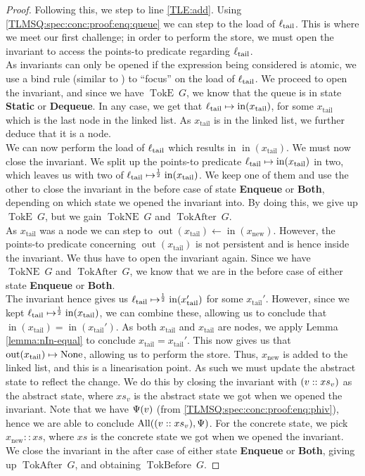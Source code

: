 \documentclass[a4paper, 10pt]{report}
\theoremstyle{definition}
\newcommand{\xsc}{xs}
\newcommand{\AllP}{\operatorname{All}}
\newcommand{\locN}[1]{\loc_{\mathrm{#1}}}
\newcommand{\loctail}{\locN{tail}}
\newcommand{\nIn}[1]{\operatorname{in}(#1)}
\newcommand{\nOut}[1]{\operatorname{out}(#1)}
\newcommand{\node}{x}
\newcommand{\nodeN}[1]{\node_{\mathrm{#1}}}
\newcommand{\nodetail}{\nodeN{tail}}
\newcommand{\nodenew}{\nodeN{new}}
\newcommand{\absvalue}{\val}
\newcommand{\absvalueList}{xs_v}
\newcommand{\StaticState}{\textbf{Static}\xspace}
\newcommand{\EnqueueState}{\textbf{Enqueue}\xspace}
\newcommand{\DequeueState}{\textbf{Dequeue}\xspace}
\newcommand{\BothState}{\textbf{Both}\xspace}
\newcommand{\Qg}{G}
\newcommand{\TokE}[1]{\operatorname{TokE} ~ #1}
\newcommand{\TokEQg}{\TokE{\Qg}}
\newcommand{\TokNE}[1]{\operatorname{TokNE} ~ #1}
\newcommand{\TokNEQg}{\TokNE{\Qg}}
\newcommand{\TokBefore}[1]{\operatorname{TokBefore} ~ #1}
\newcommand{\TokBeforeQg}{\TokBefore{\Qg}}
\newcommand{\TokAfter}[1]{\operatorname{TokAfter} ~ #1}
\newcommand{\TokAfterQg}{\TokAfter{\Qg}}
\begin{document}
\begin{proof}
Following this, we step to line \ref{TLE:add}. Using \ref{TLMSQ:spec:conc:proof:enq:queue} we can step to the load of $\loctail$. This is where we meet our first challenge; in order to perform the store, we must open the invariant to access the points-to predicate regarding $\loctail$.\\
As invariants can only be opened if the expression being considered is atomic, we use a bind rule (similar to ) to ``focus'' on the load of $\loctail$. We proceed to open the invariant, and since we have $\TokEQg$, we know that the queue is in state \StaticState or \DequeueState. In any case, we get that $\loctail \mapsto \nIn{\nodetail}$, for some $\nodetail$ which is the last node in the linked list. As $\nodetail$ is in the linked list, we further deduce that it is a node.\\
We can now perform the load of $\loctail$ which results in $\nIn{\nodetail}$. We must now close the invariant. We split up the points-to predicate $\loctail \mapsto \nIn{\nodetail}$ in two, which leaves us with two of $\loctail \mapsto^{\frac{1}{2}} \nIn{\nodetail}$. We keep one of them and use the other to close the invariant in the before case of state \EnqueueState or \BothState, depending on which state we opened the invariant into. By doing this, we give up $\TokEQg$, but we gain $\TokNEQg$ and $\TokAfterQg$.\\
As $\nodetail$ was a node we can step to $\nOut{\nodetail} \gets \nIn{\nodenew}$. However, the points-to predicate concerning $\nOut{\nodetail}$ is not persistent and is hence inside the invariant. We thus have to open the invariant again. Since we have $\TokNEQg$ and $\TokAfterQg$, we know that we are in the before case of either state \EnqueueState or \BothState.\\
The invariant hence gives us $\loctail \mapsto^{\frac{1}{2}} \nIn{\nodetail'}$ for some $\nodetail'$. However, since we kept $\loctail \mapsto^{\frac{1}{2}} \nIn{\nodetail}$, we can combine these, allowing us to conclude that $\nIn{\nodetail} = \nIn{\nodetail'}$. As both $\nodetail$ and $\nodetail$ are nodes, we apply Lemma \ref{lemma:nIn-equal} to conclude $\nodetail = \nodetail'$. This now gives us that $\nOut{\nodetail} \mapsto \None$, allowing us to perform the store. Thus, $\nodenew$ is added to the linked list, and this is a linearisation point. As such we must update the abstract state to reflect the change. We do this by closing the invariant with $(\absvalue :: \absvalueList)$ as the abstract state, where $\absvalueList$ is the abstract state we got when we opened the invariant. Note that we have $\Psi(\absvalue)$ (from \ref{TLMSQ:spec:conc:proof:enq:phiv}), hence we are able to conclude $\AllP((\absvalue :: \absvalueList), \Psi)$. For the concrete state, we pick $\nodenew :: \xsc$, where $\xsc$ is the concrete state we got when we opened the invariant. We close the invariant in the after case of either state \EnqueueState or \BothState, giving up $\TokAfterQg$, and obtaining $\TokBeforeQg$.


\end{proof}
\end{document}
